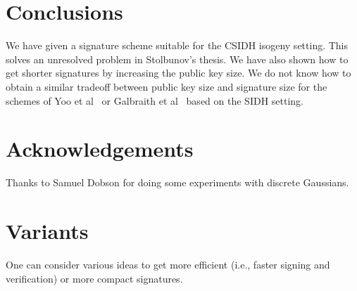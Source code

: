 \documentclass{llncs}
\begin{document}
\section{Conclusions}


We have given a signature scheme suitable for the CSIDH isogeny setting.
This solves an unresolved problem in Stolbunov's thesis.
We have also shown how to get shorter signatures by increasing the public key size.
We do not know how to obtain a similar tradeoff between public key size and signature size for the schemes of Yoo et al~\cite{YAJJS17} or Galbraith et al~\cite{GPS17} based on the SIDH setting.


\section*{Acknowledgements}

Thanks to Samuel Dobson for doing some experiments with discrete Gaussians.







\appendix


\section{Variants}\label{sec:variants}

One can consider various ideas to get more efficient (i.e., faster signing and verification) or more compact signatures.
\end{document}
